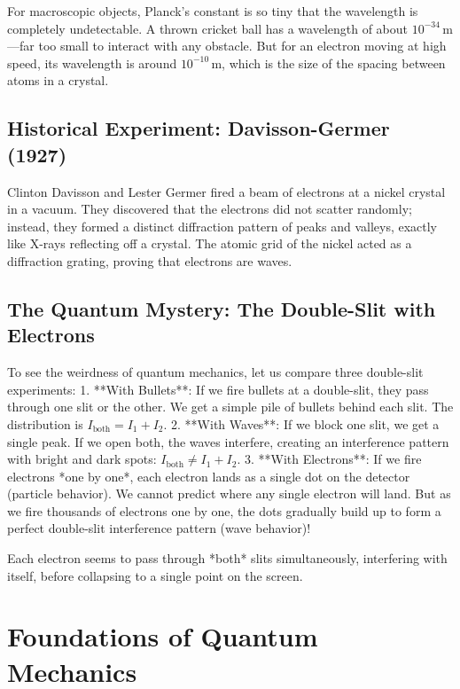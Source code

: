 For macroscopic objects, Planck's constant is so tiny that the wavelength is completely undetectable. A thrown cricket ball has a wavelength of about $10^{-34}\,\mathrm{m}$—far too small to interact with any obstacle. But for an electron moving at high speed, its wavelength is around $10^{-10}\,\mathrm{m}$, which is the size of the spacing between atoms in a crystal.

\subsection{Historical Experiment: Davisson-Germer (1927)}

Clinton Davisson and Lester Germer fired a beam of electrons at a nickel crystal in a vacuum. They discovered that the electrons did not scatter randomly; instead, they formed a distinct diffraction pattern of peaks and valleys, exactly like X-rays reflecting off a crystal. The atomic grid of the nickel acted as a diffraction grating, proving that electrons are waves.

\subsection{The Quantum Mystery: The Double-Slit with Electrons}

To see the weirdness of quantum mechanics, let us compare three double-slit experiments:
1. **With Bullets**: If we fire bullets at a double-slit, they pass through one slit or the other. We get a simple pile of bullets behind each slit. The distribution is $I_{\text{both}} = I_1 + I_2$.
2. **With Waves**: If we block one slit, we get a single peak. If we open both, the waves interfere, creating an interference pattern with bright and dark spots: $I_{\text{both}} \neq I_1 + I_2$.
3. **With Electrons**: If we fire electrons *one by one*, each electron lands as a single dot on the detector (particle behavior). We cannot predict where any single electron will land. But as we fire thousands of electrons one by one, the dots gradually build up to form a perfect double-slit interference pattern (wave behavior)! 

Each electron seems to pass through *both* slits simultaneously, interfering with itself, before collapsing to a single point on the screen.

\section{Foundations of Quantum Mechanics}

